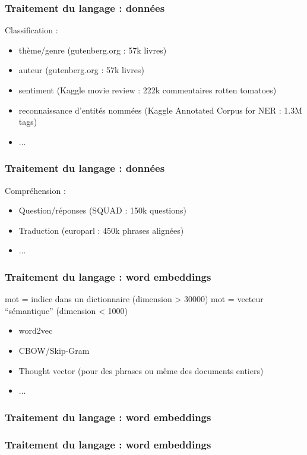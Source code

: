 \begin{frame}
  \frametitle{Traitement du langage : données}
  Classification :
  \begin{itemize}
  \item thème/genre (gutenberg.org : 57k livres)
  \item auteur (gutenberg.org : 57k livres)
  \item sentiment (Kaggle movie review : 222k commentaires rotten tomatoes)
  \item reconnaissance d'entités nommées (Kaggle Annotated Corpus for NER : 1.3M tags)
  \item ...
  \end{itemize}
\end{frame}

\begin{frame}
  \frametitle{Traitement du langage : données}
  Compréhension :
  \begin{itemize}
  \item Question/réponses (SQUAD : 150k questions)
  \item Traduction (europarl : 450k phrases alignées)
  \item ...
  \end{itemize}
\end{frame}

\begin{frame}
  \frametitle{Traitement du langage : word embeddings} 
  mot = indice dans un dictionnaire (dimension > 30000)
  \newline
  mot = vecteur ``sémantique'' (dimension < 1000) 
  \begin{itemize}
  \item word2vec
  \item CBOW/Skip-Gram
  \item Thought vector (pour des phrases ou même des documents entiers)
  \item ...
  \end{itemize}
\end{frame}

\begin{frame}
  \frametitle{Traitement du langage : word embeddings} 
\end{frame}

\begin{frame}
  \frametitle{Traitement du langage : word embeddings} 
  \begin{center}
    \href{https://ml5js.org/reference/api-Word2vec/}{} \\
    \href{https://projector.tensorflow.org/}{}
  \end{center}
\end{frame}

